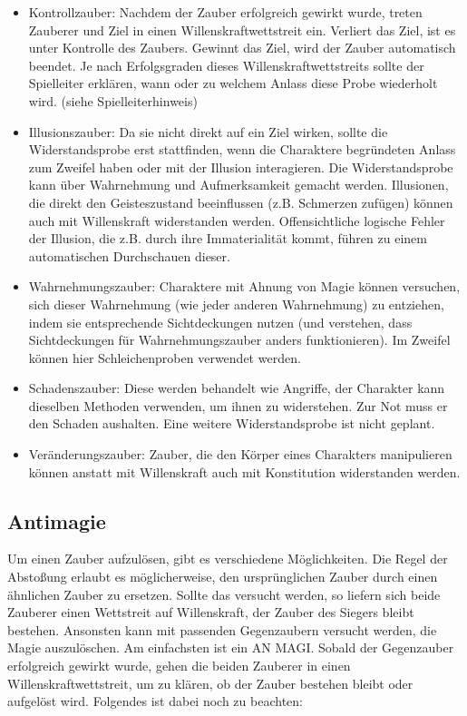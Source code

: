 \documentclass{article}
\begin{document}
\begin{itemize}
\item Kontrollzauber: Nachdem der Zauber erfolgreich gewirkt wurde, treten Zauberer und Ziel in einen Willenskraftwettstreit ein. Verliert das Ziel, ist es unter Kontrolle des Zaubers. Gewinnt das Ziel, wird der Zauber automatisch beendet. Je nach Erfolgsgraden dieses Willenskraftwettstreits sollte der Spielleiter erklären, wann oder zu welchem Anlass diese Probe wiederholt wird. (siehe Spielleiterhinweis)
\item Illusionszauber: Da sie nicht direkt auf ein Ziel wirken, sollte die Widerstandsprobe erst stattfinden, wenn die Charaktere begründeten Anlass zum Zweifel haben oder mit der Illusion interagieren. Die Widerstandsprobe kann über Wahrnehmung und Aufmerksamkeit gemacht werden. Illusionen, die direkt den Geisteszustand beeinflussen (z.B. Schmerzen zufügen) können auch mit Willenskraft widerstanden werden. Offensichtliche logische Fehler der Illusion, die z.B. durch ihre Immaterialität kommt, führen zu einem automatischen Durchschauen dieser.
\item Wahrnehmungszauber: Charaktere mit Ahnung von Magie können versuchen, sich dieser Wahrnehmung (wie jeder anderen Wahrnehmung) zu entziehen, indem sie entsprechende Sichtdeckungen nutzen (und verstehen, dass Sichtdeckungen für Wahrnehmungszauber anders funktionieren). Im Zweifel können hier Schleichenproben verwendet werden.
\item Schadenszauber: Diese werden behandelt wie Angriffe, der Charakter kann dieselben Methoden verwenden, um ihnen zu widerstehen. Zur Not muss er den Schaden aushalten. Eine weitere Widerstandsprobe ist nicht geplant.
\item Veränderungszauber: Zauber, die den Körper eines Charakters manipulieren können anstatt mit Willenskraft auch mit Konstitution widerstanden werden.
\end{itemize}

\begin{center}
\subsection{Antimagie}
\end{center}

Um einen Zauber aufzulösen, gibt es verschiedene Möglichkeiten. Die Regel der Abstoßung erlaubt es möglicherweise, den
ursprünglichen Zauber durch einen ähnlichen Zauber zu ersetzen. Sollte das versucht werden, so liefern sich beide
Zauberer einen Wettstreit auf Willenskraft, der Zauber des Siegers bleibt bestehen. Ansonsten kann mit passenden
Gegenzaubern versucht werden, die Magie auszulöschen. Am einfachsten ist ein AN MAGI. Sobald der Gegenzauber
erfolgreich gewirkt wurde, gehen die beiden Zauberer in einen Willenskraftwettstreit, um zu klären, ob der Zauber
bestehen bleibt oder aufgelöst wird. Folgendes ist dabei noch zu beachten:
\end{document}

